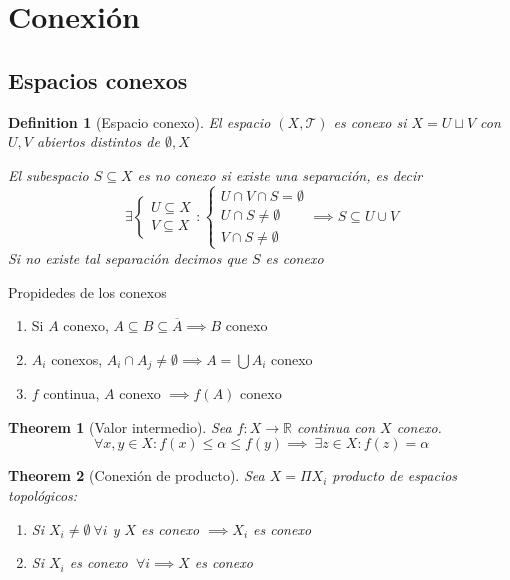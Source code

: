 \documentclass[leqno]{article}
\newtheorem*{definition}{Definition}
\newtheorem*{theorem}{Theorem}
\begin{document}
\section{Conexión}
\subsection{Espacios conexos}
\begin{definition}[Espacio conexo] El espacio $(X, \mathcal{T})$ es conexo si $X = U \sqcup V$ con  $U, V$ abiertos distintos de  $\emptyset, X$

  El subespacio $S\subseteq X$ es no conexo si existe una separación, es decir
  \[
	\ \exists 
  \begin{cases}
   U\subseteq X \\
   V \subseteq X
  \end{cases}
  :
  \begin{cases}
    U \cap V \cap S = \emptyset \\
	U \cap S \neq \emptyset \\
	V \cap S \neq \emptyset
  \end{cases}
  \implies S\subseteq U \cup V
  \] 
  Si no existe tal separación decimos que $S$ es conexo
\end{definition}

Propidedes de los conexos
  \begin{enumerate}[topsep=-6pt, itemsep=0pt]
    \item Si $A$ conexo,  $A\subseteq B\subseteq \overline{A} \implies B$ conexo
	\item $A_i$ conexos,  $A_i\cap A_j \neq \emptyset \implies A = \bigcup A_i$ conexo  
	\item $f$ continua, $A$ conexo  $\implies f(A)$ conexo
  \end{enumerate}

\begin{theorem}[Valor intermedio] Sea $f:X \to \mathbb{R}$ continua con $X$ conexo.
  \[
  \ \forall x, y \in X : f(x)\le \alpha \le f(y) \implies \ \exists z \in X : f(z) = \alpha 
  \] 
\end{theorem}

\begin{theorem}[Conexión de producto] Sea $X = \Pi X_i$ producto de espacios topológicos:
   \begin{enumerate}[topsep=-6pt, itemsep=0pt]
    \item Si $X_i\neq \emptyset \ \forall i$ y $X$ es conexo  $\implies X_i$ es conexo
	\item Si $X_i$ es conexo  $\ \forall i \implies X$ es conexo
  \end{enumerate}
\end{theorem}
\end{document}
